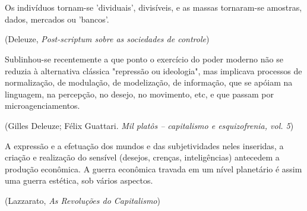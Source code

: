 \chapter*{}

\vspace*{\fill}

\thispagestyle{empty}

\epigraph{Os indivíduos tornam-se 'dividuais', divisíveis, e as massas
tornaram-se amostras, dados, mercados ou 'bancos'.}{(Deleuze, \emph{Post-scriptum sobre as sociedades de controle})}

\epigraph{Sublinhou-se recentemente a que ponto o exercício do poder moderno não
se reduzia à alternativa clássica "repressão ou ideologia", mas
implicava processos de normalização, de modulação, de modelização, de
informação, que se apóiam na linguagem, na percepção, no desejo, no
movimento, etc, e que passam por microagenciamentos.}{(Gilles Deleuze; Félix Guattari. \emph{Mil platôs -- capitalismo e esquizofrenia, vol. 5})}

\epigraph{A expressão e a efetuação dos mundos e das subjetividades neles
inseridas, a criação e realização do sensível (desejos, crenças,
inteligências) antecedem a produção econômica. A guerra econômica
travada em um nível planetário é assim uma guerra estética, sob vários
aspectos.}{(Lazzarato, \emph{As Revoluções do Capitalismo})}
